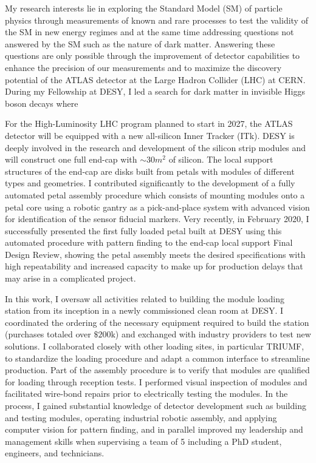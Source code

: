 \documentclass[a4paper]{article}
\begin{document}
\thispagestyle{fancy} 
 \lfoot{} \rfoot{\bf \thepage} \cfoot{}

\fontsize{11}{14}
\selectfont


My research interests lie in exploring the Standard Model (SM) of particle physics through measurements of known and rare processes
to test the validity of the SM in new energy regimes and at the same time addressing questions not answered by the SM such as the nature of dark matter. Answering these questions are only possible through the improvement of detector capabilities to enhance the precision of our
measurements and to maximize the discovery potential of the ATLAS detector at the Large Hadron Collider (LHC) at CERN.
During my Fellowship at DESY, I led a search for dark matter in invisible Higgs boson decays where

For the High-Luminosity LHC program planned to start in 2027, the ATLAS detector will be equipped with a new all-silicon Inner Tracker (ITk). DESY is deeply involved in the research and development of the silicon strip modules and will construct one full end-cap with $\sim 30 m^2$ of silicon.
The local support structures of the end-cap are disks built from petals with modules of different types and geometries.
I contributed significantly to the development of a fully automated petal assembly procedure which consists of mounting modules onto a petal core using a robotic gantry as a pick-and-place system with advanced vision for identification of the sensor fiducial markers.
Very recently, in February 2020, I successfully presented the first fully loaded petal built at DESY using this automated procedure with pattern finding to the end-cap local support Final Design Review, showing the petal assembly meets the desired specifications with high repeatability and increased capacity to make up for production delays that may arise in a complicated project.

In this work, I oversaw all activities related to building the module loading station from its inception in a newly commissioned clean room at DESY. I coordinated the ordering of the necessary equipment required to build the station (purchases totaled over $\$200$k) and exchanged with industry providers to test new solutions. I collaborated closely with other loading sites, in particular TRIUMF, to standardize the loading procedure and adapt a common interface to streamline production. Part of the assembly procedure is to verify that modules are qualified for loading through reception tests. I performed visual inspection of modules and facilitated wire-bond repairs prior to electrically testing the modules.
In the process, I gained substantial knowledge of detector development such as building and testing modules, operating industrial robotic assembly, and applying computer vision for pattern finding, and in parallel improved my leadership and management skills when supervising a team of 5 including a PhD student, engineers, and technicians.
\end{document}
